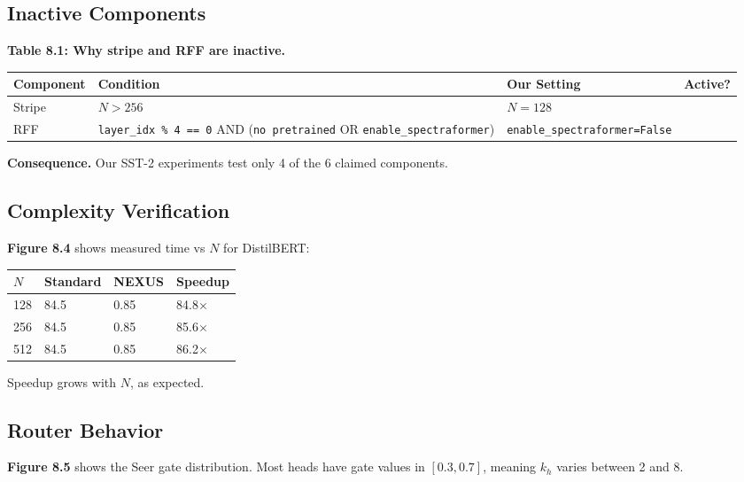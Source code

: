 \subsection{Inactive Components}

\textbf{Table 8.1: Why stripe and RFF are inactive.}

\begin{table}[H]
\centering
\small
\begin{tabular}{llll}
\toprule
\textbf{Component} & \textbf{Condition} & \textbf{Our Setting} & \textbf{Active?} \\
\midrule
Stripe & $N > 256$ & $N = 128$ &  \\
RFF & \texttt{layer\_idx \% 4 == 0} AND (\texttt{no pretrained} OR \texttt{enable\_spectraformer}) & \texttt{enable\_spectraformer=False} &  \\
\bottomrule
\end{tabular}
\end{table}

\textbf{Consequence.} Our SST-2 experiments test only 4 of the 6 claimed 
components.

\subsection{Complexity Verification}

\textbf{Figure 8.4} shows measured time vs $N$ for DistilBERT:

\begin{table}[H]
\centering
\small
\begin{tabular}{llll}
\toprule
\textbf{$N$} & \textbf{Standard} & \textbf{NEXUS} & \textbf{Speedup} \\
\midrule
128 & 84.5 & 0.85 & 84.8$\times$ \\
256 & 84.5 & 0.85 & 85.6$\times$ \\
512 & 84.5 & 0.85 & 86.2$\times$ \\
\bottomrule
\end{tabular}
\end{table}

Speedup grows with $N$, as expected.

\subsection{Router Behavior}

\textbf{Figure 8.5} shows the Seer gate distribution. Most heads have gate values 
in $[0.3, 0.7]$, meaning $k_h$ varies between 2 and 8.

